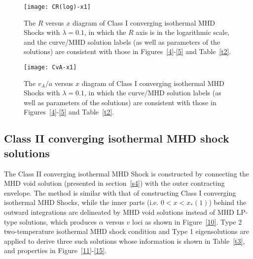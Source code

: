 \documentclass[fleqn,usenatbib]{mnras}
\begin{document}
\begin{figure}
\centering
\texttt{[image: CR(log)-x1]}
\caption{The $R$ versus $x$ diagram of Class I converging isothermal MHD Shocks with $\lambda=0.1$, in which the $R$ axis is in the logarithmic scale, and the curve/MHD solution labels (as well as parameters of the solutions) are consistent with those in Figures~\ref{4}-\ref{5} and Table~\ref{t2}. 
}
\label{8}
\end{figure}

\begin{figure}
\centering
\texttt{[image: CvA-x1]}
\caption{The $v_{A}/a$ versus $x$ diagram of Class I converging isothermal MHD Shocks with $\lambda=0.1$, in which the curve/MHD solution labels (as well as parameters of the solutions) are consistent with those in Figures~\ref{4}-\ref{5} and Table~\ref{t2}.}
\label{9}
\end{figure}

\subsection{Class II converging isothermal MHD shock solutions}
\label{s5.2}
The Class II converging isothermal MHD Shock is constructed by connecting the MHD void solution (presented in section~\ref{s4}) with the outer contracting envelope. The method is similar with that of constructing Class I converging isothermal MHD Shocks, while the inner parts (i.e. $0<x<x_{*}(1)$) behind the outward integrations are delineated by MHD void solutions instead of MHD LP-type solutions, which produces $\alpha$ versus $v$ loci as shown in Figure~\ref{10}. Type 2 two-temperature isothermal MHD shock condition and Type 1 eigensolutions are applied to derive three such solutions whose information is shown in Table~\ref{t3}, and properties in Figure~\ref{11}-\ref{15}. 
\end{document}

